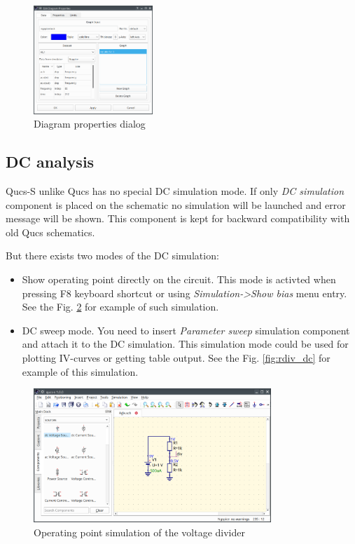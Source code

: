 \documentclass[a4paper,12pt]{article}
\begin{document}
\begin{itemize}
    \begin{figure}[!ht]
  \begin{center}
    \includegraphics[width=0.4\textwidth]{img/diagr_dlg.png}
  \end{center}
  \caption{Diagram properties dialog} \label{fig:diagr_dlg}
  \end{figure}
  
\end{itemize}


\subsection{DC analysis} \label{sec:dc}

Qucs-S unlike Qucs has no special DC simulation mode. If only \emph{DC 
simulation} component is placed on the schematic no simulation will be launched 
and error message will be shown. This component is kept for backward 
compatibility with old Qucs schematics.

But there exists two modes of the DC simulation:

\begin{itemize}
 \item Show operating point directly on the circuit. This mode is activted when 
pressing F8 keyboard shortcut or using \emph{Simulation->Show bias} menu 
entry. See the Fig. \ref{fig:rdiv_f8} for example of such simulation.
 \item DC sweep mode. You need to insert \emph{Parameter sweep} simulation 
component and attach it to the DC simulation. This simulation mode could be 
used for plotting IV-curves or getting table output. See the Fig. 
\ref{fig:rdiv_dc} for example of this simulation. 
\end{itemize}


\begin{figure}[!ht]
    \begin{center}
        \includegraphics[width=0.8\textwidth]{img/rdiv_f8.png}
    \end{center}
    \caption{Operating point simulation of the voltage divider} 
\label{fig:rdiv_f8}
\end{figure}
\end{document}
